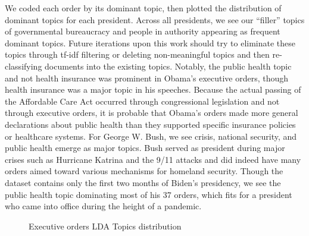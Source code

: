 \documentclass{article}
\begin{document}
{{We coded each order by its dominant topic, then plotted the distribution of dominant topics for each president. Across all presidents, we see our “filler” topics of governmental bureaucracy and people in authority appearing as frequent dominant topics. Future iterations upon this work should try to eliminate these topics through tf-idf filtering or deleting non-meaningful topics and then re-classifying documents into the existing topics. 
Notably, the public health topic and not health insurance was prominent in Obama’s executive orders, though health insurance was a major topic in his speeches. Because the actual passing of the Affordable Care Act occurred through congressional legislation and not through executive orders, it is probable that Obama’s orders made more general declarations about public health than they supported specific insurance policies or healthcare systems. For George W. Bush, we see crisis, national security, and public health emerge as major topics. Bush served as president during major crises such as Hurricane Katrina and the 9/11 attacks and did indeed have many orders aimed toward various mechanisms for homeland security. 
Though the dataset contains only the first two months of Biden’s presidency, we see the public health topic dominating most of his 37 orders, which fits for a president who came into office during the height of a pandemic.
} 

\begin{figure}[H]
	\caption{\label{fig:my-label4} Executive orders LDA Topics distribution}
\end{figure}

}
\end{document}
